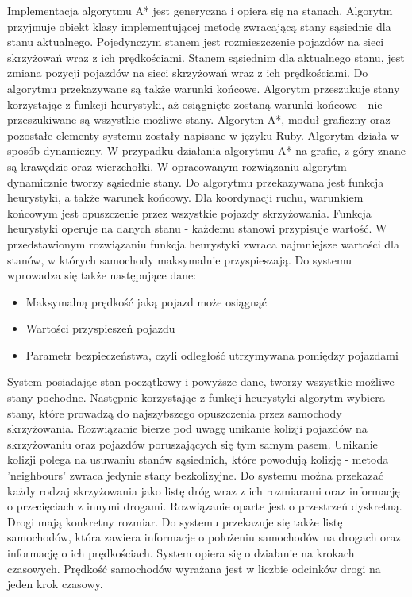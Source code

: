\newline
\indent 
Implementacja algorytmu A* jest generyczna i opiera się na stanach. Algorytm przyjmuje obiekt klasy implementującej metodę zwracającą stany sąsiednie dla stanu aktualnego. Pojedynczym stanem jest rozmieszczenie pojazdów na sieci skrzyżowań wraz z ich prędkościami. Stanem sąsiednim dla aktualnego stanu, jest zmiana pozycji pojazdów na sieci skrzyżowań wraz z ich prędkościami. Do algorytmu przekazywane są także warunki końcowe. Algorytm przeszukuje stany korzystając z funkcji heurystyki, aż osiągnięte zostaną warunki końcowe - nie przeszukiwane są wszystkie możliwe stany. Algorytm A*, moduł graficzny oraz pozostałe elementy systemu zostały napisane w języku Ruby. Algorytm działa w sposób dynamiczny. W przypadku działania algorytmu A* na grafie, z góry znane są krawędzie oraz wierzchołki. W opracowanym rozwiązaniu algorytm dynamicznie tworzy sąsiednie stany.
\newline
\indent
Do algorytmu przekazywana jest funkcja heurystyki, a także warunek końcowy. Dla koordynacji ruchu, warunkiem końcowym jest opuszczenie przez wszystkie pojazdy skrzyżowania. Funkcja heurystyki operuje na danych stanu - każdemu stanowi przypisuje wartość. W przedstawionym rozwiązaniu funkcja heurystyki zwraca najmniejsze wartości dla stanów, w których samochody maksymalnie przyspieszają.
\newline
\newline
\noindent
Do systemu wprowadza się także następujące dane:
\begin{itemize}
\item Maksymalną prędkość jaką pojazd może osiągnąć
\item Wartości przyspieszeń pojazdu
\item Parametr bezpieczeństwa, czyli odległość utrzymywana pomiędzy pojazdami
\end{itemize}
System posiadając stan początkowy i powyższe dane, tworzy wszystkie możliwe stany pochodne. Następnie korzystając z funkcji heurystyki algorytm wybiera stany, które prowadzą do najszybszego opuszczenia przez samochody skrzyżowania.
\newline
\indent
Rozwiązanie bierze pod uwagę unikanie kolizji pojazdów na skrzyżowaniu oraz pojazdów poruszających się tym samym pasem. Unikanie kolizji polega na usuwaniu stanów sąsiednich, które powodują kolizję - metoda 'neighbours' zwraca jedynie stany bezkolizyjne.
\newline
\indent
Do systemu można przekazać każdy rodzaj skrzyżowania jako listę dróg wraz z ich rozmiarami oraz informację o przecięciach z innymi drogami. Rozwiązanie oparte jest o przestrzeń dyskretną. Drogi mają konkretny rozmiar. Do systemu przekazuje się także listę samochodów, która zawiera informacje o położeniu samochodów na drogach oraz informację o ich prędkościach. System opiera się o działanie na krokach czasowych. Prędkość samochodów wyrażana jest w liczbie odcinków drogi na jeden krok czasowy.
